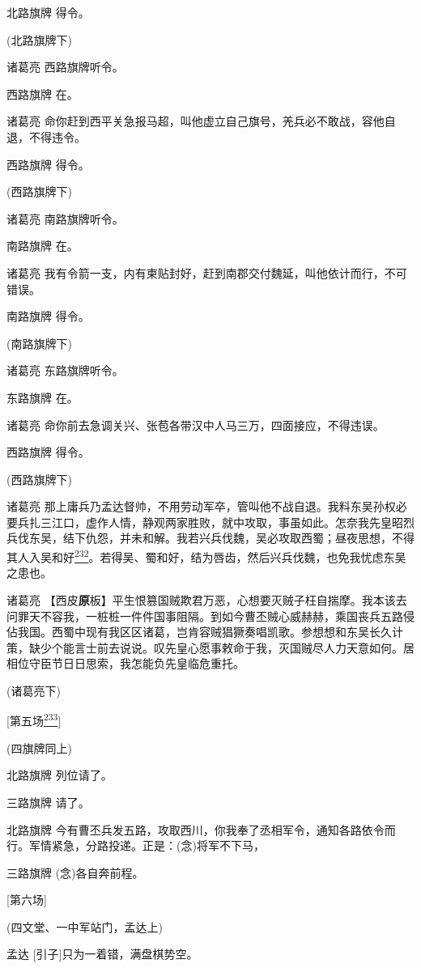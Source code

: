 北路旗牌 得令。

(北路旗牌下)

诸葛亮 西路旗牌听令。

西路旗牌 在。

诸葛亮
命你赶到西平关急报马超，叫他虚立自己旗号，羌兵必不敢战，容他自退，不得违令。

西路旗牌 得令。

(西路旗牌下)

诸葛亮 南路旗牌听令。

南路旗牌 在。

诸葛亮
我有令箭一支，内有柬贴封好，赶到南郡交付魏延，叫他依计而行，不可错误。

南路旗牌 得令。

(南路旗牌下)

诸葛亮 东路旗牌听令。

东路旗牌 在。

诸葛亮 命你前去急调关兴、张苞各带汉中人马三万，四面接应，不得违误。

西路旗牌 得令。

(西路旗牌下)

诸葛亮
那上庸兵乃孟达督帅，不用劳动军卒，管叫他不战自退。我料东吴孙权必要兵扎三江口，虚作人情，静观两家胜败，就中攻取，事虽如此。怎奈我先皇昭烈兵伐东吴，结下仇怨，并未和解。我若兴兵伐魏，吴必攻取西蜀；昼夜思想，不得其人入吴和好\protect\hyperlink{fn232}{\textsuperscript{232}}。若得吴、蜀和好，结为唇齿，然后兴兵伐魏，也免我忧虑东吴之患也。

诸葛亮
【西皮\textbf{原}板】平生恨篡国贼欺君万恶，心想要灭贼子枉自揣摩。我本该去问罪天不容我，一桩桩一件件国事阻隔。到如今曹丕贼心威赫赫，乘国丧兵五路侵佔我国。西蜀中现有我区区诸葛，岂肯容贼猖獗奏唱凯歌。参想想和东吴长久计策，缺少个能言士前去说说。叹先皇心愿事敕命于我，灭国贼尽人力天意如何。居相位守臣节日日思索，我怎能负先皇临危重托。

(诸葛亮下)

{[}第五场\protect\hyperlink{fn233}{\textsuperscript{233}}{]}

(四旗牌同上)

北路旗牌 列位请了。

三路旗牌 请了。

北路旗牌
今有曹丕兵发五路，攻取西川，你我奉了丞相军令，通知各路依令而行。军情紧急，分路投递。正是：(念)将军不下马，

三路旗牌 (念)各自奔前程。

{[}第六场{]}

(四文堂、一中军站门，孟达上)

孟达 {[}引子{]}只为一着错，满盘棋势空。

